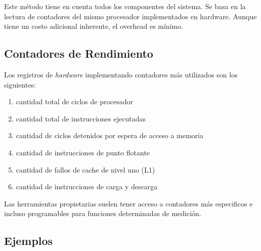 \documentclass[a4paper]{report}
\begin{document}
Este m\'etodo tiene en cuenta todos los componentes del sistema.
Se basa en la lectura de contadores del mismo procesador implementados en hardware.
Aunque tiene un costo adicional inherente, el overhead es m\'inimo.

\subsection{Contadores de Rendimiento}

Los registros de {\it hardware} implementando contadores m\'as utilizados son los
siguientes:

\begin{enumerate}
\item cantidad total de ciclos de procesador
\item cantidad total de instrucciones ejecutadas
\item cantidad de ciclos detenidos por espera de acceso a memoria
\item cantidad de instrucciones de punto flotante
\item cantidad de fallos de cache de nivel uno (L1)
\item cantidad de instrucciones de carga y descarga
\end{enumerate}

Las herramientas propietarias suelen tener acceso a contadores m\'as especificos e
incluso programables para funciones determinadas de medici\'on.

\subsection{Ejemplos}
\end{document}
